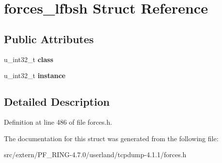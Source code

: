 \hypertarget{structforces__lfbsh}{
\section{forces\_\-lfbsh Struct Reference}
\label{structforces__lfbsh}
}
\subsection*{Public Attributes}
\begin{DoxyCompactItemize}
\item 
\hypertarget{structforces__lfbsh_aa01bcecd441ec30df5dcabe0c93ca598}{
u\_\-int32\_\-t {\bfseries class}}
\label{structforces__lfbsh_aa01bcecd441ec30df5dcabe0c93ca598}

\item 
\hypertarget{structforces__lfbsh_a12c70d44cabfbc464f6f5472df002348}{
u\_\-int32\_\-t {\bfseries instance}}
\label{structforces__lfbsh_a12c70d44cabfbc464f6f5472df002348}

\end{DoxyCompactItemize}


\subsection{Detailed Description}


Definition at line 486 of file forces.h.



The documentation for this struct was generated from the following file:\begin{DoxyCompactItemize}
\item 
src/extern/PF\_\-RING-\/4.7.0/userland/tcpdump-\/4.1.1/forces.h\end{DoxyCompactItemize}
